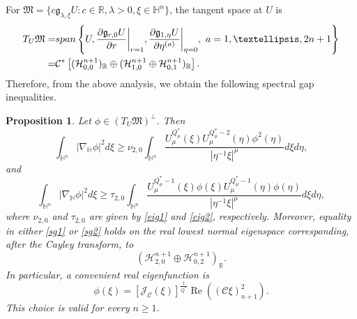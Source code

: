 \documentclass[10pt,a4paper]{amsart}
\newtheorem{proposition}{Proposition}[section]
\begin{document}
{For $\mathfrak{M}=\{c\mathfrak{g}_{\lambda,\xi}U:c\in\mathbb{R},\lambda>0,\xi\in\mathbb{H}^{n}\}$, the tangent space at $U$ is}
\begin{align*}
 T_U \mathfrak{M}=&{\rm span}\left\{U, \frac{\partial \mathfrak{g}_{r,0}U}{\partial r}\bigg|_{r=1},\frac{\partial \mathfrak{g}_{1,\eta}U}{\partial \eta^{(a)}}\bigg|_{\eta=0},~a=1,\ldots,2n+1\right\}\\
 =&\mathcal C^*\left[(\mathcal H_{0,0}^{n+1})_{\mathbb R}
 \oplus(\mathcal H_{1,0}^{n+1}\oplus\mathcal H_{0,1}^{n+1})_{\mathbb R}\right].
\end{align*}
Therefore, from the above analysis, we obtain the following spectral gap inequalities.
\begin{proposition}\label{sg}
{Let $\phi\in(T_U\mathfrak{M})^\perp$. Then}
\begin{equation}\label{sg1}
 \int_{\mathbb{H}^{n}}|\nabla_\mathbb{H} \phi|^2 d\xi\geq \nu_{2,0}\int_{\mathbb{H}^{n}}\frac{U_\mu
^{Q^{\ast}_{\mu}}(\xi)U_\mu^{Q^{\ast}_{\mu}-2}(\eta)\phi^2(\eta)}{|\eta^{-1}\xi|^{\mu}}{d}\xi d\eta,
\end{equation}
and
\begin{equation}\label{sg2}
 \int_{\mathbb{H}^{n}}|\nabla_\mathbb{H} \phi|^2 d\xi\geq \tau_{2,0}\int_{\mathbb{H}^{n}}\frac{U_\mu
^{Q^{\ast}_{\mu}-1}(\xi)\phi(\xi) U_\mu^{Q^{\ast}_{\mu}-1}(\eta)\phi(\eta)}{|\eta^{-1}\xi|^{\mu}}{d}\xi d\eta,
\end{equation}
{where $\nu_{2,0}$ and $\tau_{2,0}$ are given by \eqref{eig1} and \eqref{eig2}, respectively.} {Moreover, equality in either \eqref{sg1} or \eqref{sg2} holds on the real lowest normal eigenspace corresponding, after the Cayley transform, to
\[
(\mathcal H_{2,0}^{n+1}\oplus\mathcal H_{0,2}^{n+1})_{\mathbb R}.
\]
In particular, a convenient real eigenfunction is
\begin{equation*}
\phi(\xi)=[\mathcal J_{\mathcal C}(\xi)]^{\frac{1}{Q^{\ast}}}\operatorname{Re}\!\left((\mathcal C\xi)_{n+1}^{2}\right).
\end{equation*}
This choice is valid for every $n\ge1$.}
\end{proposition}
\end{document}
